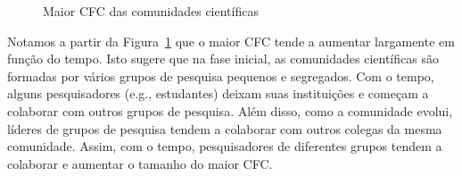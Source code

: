 \documentclass[12pt]{article}
\begin{document}
\begin{figure}[!htb]
  \vspace{-0.5cm}
  \begin{center}
  \end{center}
  \caption{Maior CFC das comunidades científicas}
  \label{fig:metrics_largest_connected_component}
\end{figure}

Notamos a partir da Figura~\ref{fig:metrics_largest_connected_component} que o maior CFC tende a aumentar largamente em função do 
tempo. Isto sugere que na fase inicial, as comunidades científicas são formadas por vários grupos de pesquisa pequenos 
e segregados. Com o tempo, alguns pesquisadores (e.g., estudantes) deixam suas instituições e começam a colaborar com outros 
grupos de pesquisa. Além disso, como a comunidade evolui, líderes de grupos de pesquisa tendem a colaborar com outros colegas 
da mesma comunidade. Assim, com o tempo, pesquisadores de diferentes grupos tendem a colaborar e aumentar o tamanho do maior 
CFC.
\end{document}
